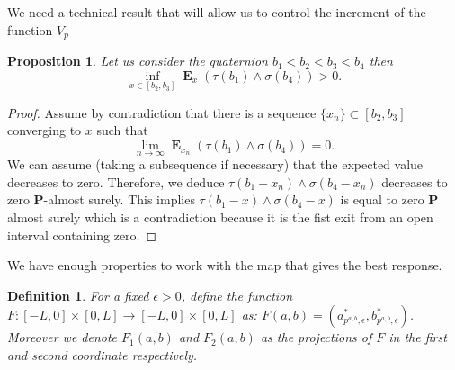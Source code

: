 \documentclass{article}
\newtheorem{proposition}[thm]{Proposition}
\newtheorem{definition}[thm]{Definition}
\newcommand\E{\operatorname{\mathbf{E}}}
\begin{document}
We need a technical result that will allow us to control the increment of the function $V_p$
\begin{proposition}\label{Ch4P:MFGquaternion}
    Let us consider the quaternion $b_1<b_2<b_3<b_4$ then $$\inf_{x \in [b_2,b_3]}\E_x (\tau(b_1) \wedge \sigma(b_4) )> 0.$$
\end{proposition}
\begin{proof}
    Assume by contradiction that there is a sequence $\lbrace x_n \rbrace \subset [b_2,b_3]$ converging to $x$ such that 
    $$\lim_{n \to \infty} \E_{x_n} (\tau(b_1)\wedge \sigma(b_4)) =0 . $$
    We can assume (taking a subsequence if necessary) that the expected value decreases to zero. Therefore, we deduce $\tau(b_1-x_n) \wedge \sigma(b_4-x_n)  $ decreases to zero $\mathbf{P}$-almost surely. This implies $\tau(b_1-x) \wedge \sigma(b_4 -x) $ is equal to zero $\mathbf{P}$ almost surely which is a contradiction because it is the fist exit from an open interval containing zero.   
\end{proof}


We have enough properties to work with the map that gives the best response.
\begin{definition}
For a fixed $\epsilon>0$, define the function $F: [-L,0] \times [0,L] \rightarrow [-L,0] \times [0,L] $ as:
$ F(a,b)=(a^{\ast}_{p^{a,b},\epsilon},b^{\ast}_{p^{a,b},\epsilon}) $. Moreover we denote $F_1(a,b)$ and $F_2(a,b)$ as the projections of $F$ in the first and second coordinate respectively.

\end{definition}
\end{document}
